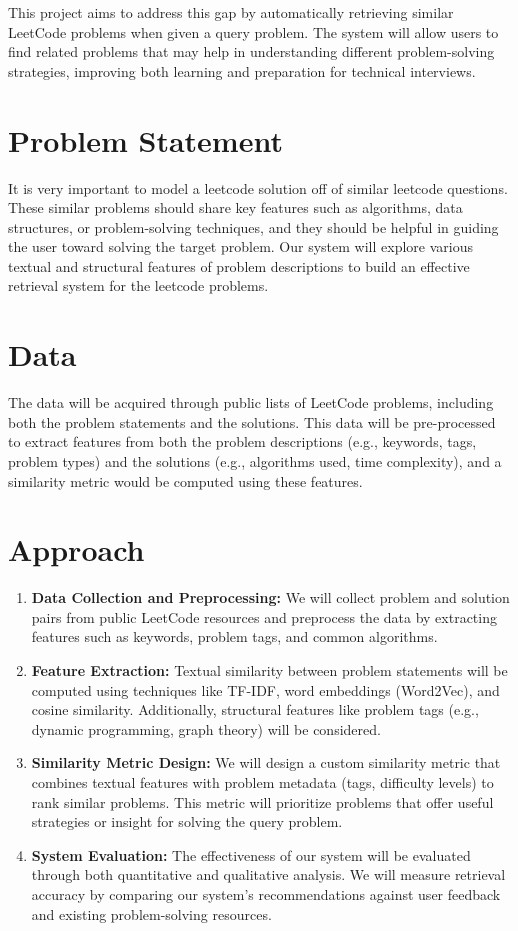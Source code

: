 \documentclass[sigconf]{acmart}
\begin{document}
This project aims to address this gap by automatically retrieving similar LeetCode problems when given a query problem. The system will allow users to find related problems that may help in understanding different problem-solving strategies, improving both learning and preparation for technical interviews.

\section{Problem Statement}
It is very important to model a leetcode solution off of similar leetcode questions. These similar problems should share key features such as algorithms, data structures, or problem-solving techniques, and they should be helpful in guiding the user toward solving the target problem. Our system will explore various textual and structural features of problem descriptions to build an effective retrieval system for the leetcode problems.


\section{Data}

The data will be acquired through public lists of LeetCode problems, including both the problem statements and the solutions. This data will be pre-processed to extract features from both the problem descriptions (e.g., keywords, tags, problem types) and the solutions (e.g., algorithms used, time complexity), and a similarity metric would be computed using these features.



\section{Approach}
\begin{enumerate}
    \item \textbf{Data Collection and Preprocessing:} We will collect problem and solution pairs from public LeetCode resources and preprocess the data by extracting features such as keywords, problem tags, and common algorithms.
    \item \textbf{Feature Extraction:} Textual similarity between problem statements will be computed using techniques like TF-IDF, word embeddings (Word2Vec), and cosine similarity. Additionally, structural features like problem tags (e.g., dynamic programming, graph theory) will be considered.
    \item \textbf{Similarity Metric Design:} We will design a custom similarity metric that combines textual features with problem metadata (tags, difficulty levels) to rank similar problems. This metric will prioritize problems that offer useful strategies or insight for solving the query problem.
    \item \textbf{System Evaluation:} The effectiveness of our system will be evaluated through both quantitative and qualitative analysis. We will measure retrieval accuracy by comparing our system’s recommendations against user feedback and existing problem-solving resources.
\end{enumerate}
\end{document}

